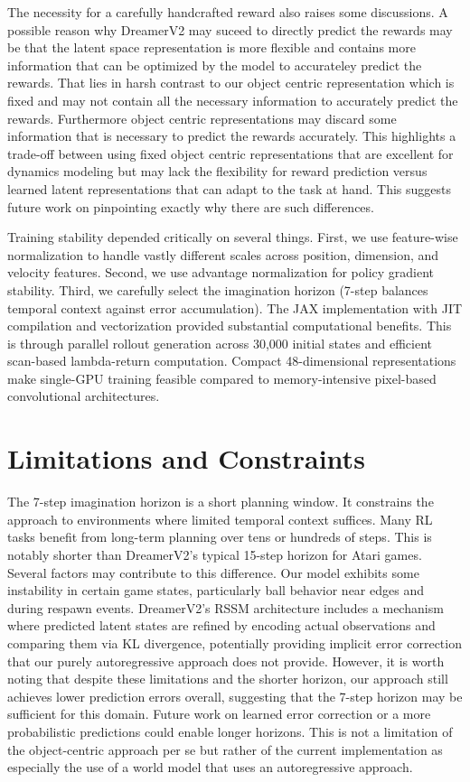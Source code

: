 \documentclass[
	english,
	ruledheaders=section,
	class=report,
	thesis={type=master},
	accentcolor=9c,
	custommargins=true,
	marginpar=false,
	parskip=half-,
	fontsize=11pt,
	pdfa=true,
]{tudapub}
\newcommand{\worldmodel}{world model}
\begin{document}
The necessity for a carefully handcrafted reward also raises some discussions.
A possible reason why DreamerV2 may suceed to directly predict the rewards may be that the 
latent space representation is more flexible and contains more information that can be optimized
by the model to accurateley predict the rewards. That lies in harsh contrast to our object centric representation
which is fixed and may not contain all the necessary information to accurately predict the rewards. 
Furthermore object centric representations may discard some information that is necessary to predict the rewards
accurately. This highlights a trade-off between using fixed object centric representations that are
excellent for dynamics modeling but may lack the flexibility for reward prediction versus learned latent representations
that can adapt to the task at hand. This suggests future work on pinpointing exactly why there are such differences.

Training stability depended critically on several things. First, we use
feature-wise normalization to handle vastly different scales across position,
dimension, and velocity features. Second, we use advantage normalization for
policy gradient stability. Third, we carefully select the imagination horizon
(7-step balances temporal context against error accumulation). The JAX
implementation with JIT compilation and vectorization provided substantial
computational benefits. This is through parallel rollout generation across
30,000 initial states and efficient scan-based lambda-return computation.
Compact 48-dimensional representations make single-GPU training feasible
compared to memory-intensive pixel-based convolutional architectures.

\section{Limitations and Constraints}
\label{sec:limitations}

The 7-step imagination horizon is a short planning window. It constrains the
approach to environments where limited temporal context suffices. Many RL tasks
benefit from long-term planning over tens or hundreds of steps. This is notably
shorter than DreamerV2's typical 15-step horizon for Atari games. Several factors may contribute 
to this difference. Our
model exhibits some instability in certain game states, particularly ball behavior
near edges and during respawn events. DreamerV2's RSSM architecture includes a
mechanism where predicted latent states are refined by encoding actual observations
and comparing them via KL divergence, potentially providing implicit error correction
that our purely autoregressive approach does not provide. However, it is worth noting that
despite these limitations and the shorter horizon, our approach still achieves lower prediction errors overall, 
suggesting that the 7-step horizon may be sufficient for this domain. Future work on learned error
correction or a more probabilistic predictions could enable longer horizons.
This is not a limitation of the object-centric approach per se but rather of the current 
implementation as especially
the use of a \worldmodel{} that uses an autoregressive approach.
\end{document}
